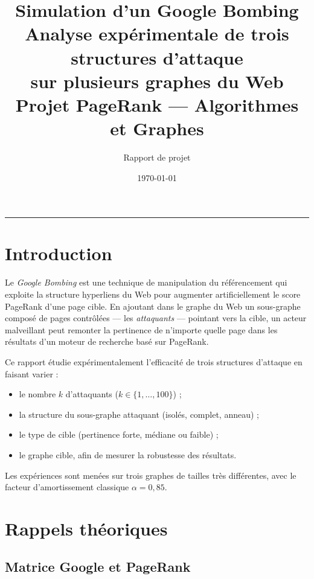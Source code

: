\documentclass[12pt,a4paper]{article}
\title{%
  \LARGE\textbf{Simulation d'un Google Bombing}\\[8pt]
  \large Analyse exp\'{e}rimentale de trois structures d'attaque\\
  sur plusieurs graphes du Web\\[6pt]
  \normalsize Projet PageRank --- Algorithmes et Graphes
}
\author{Rapport de projet}
\date{\today}
\theoremstyle{definition}
\begin{document}
\maketitle
\tableofcontents
\bigskip\hrule\bigskip

\section{Introduction}

Le \emph{Google Bombing} est une technique de manipulation du r\'{e}f\'{e}rencement
qui exploite la structure hyperliens du Web pour augmenter artificiellement
le score PageRank d'une page cible. En ajoutant dans le graphe du Web un
sous-graphe compos\'{e} de pages contr\^{o}l\'{e}es --- les \emph{attaquants} ---
pointant vers la cible, un acteur malveillant peut remonter la pertinence
de n'importe quelle page dans les r\'{e}sultats d'un moteur de recherche
bas\'{e} sur PageRank.

Ce rapport \'{e}tudie exp\'{e}rimentalement l'efficacit\'{e} de trois structures
d'attaque en faisant varier :
\begin{itemize}[noitemsep]
  \item le nombre $k$ d'attaquants ($k \in \{1, \ldots, 100\}$) ;
  \item la structure du sous-graphe attaquant (isol\'{e}s, complet, anneau) ;
  \item le type de cible (pertinence forte, m\'{e}diane ou faible) ;
  \item le graphe cible, afin de mesurer la robustesse des r\'{e}sultats.
\end{itemize}
Les exp\'{e}riences sont men\'{e}es sur trois graphes de tailles tr\`{e}s diff\'{e}rentes,
avec le facteur d'amortissement classique $\alpha = 0{,}85$.

\section{Rappels th\'{e}oriques}

\subsection{Matrice Google et PageRank}
\end{document}
